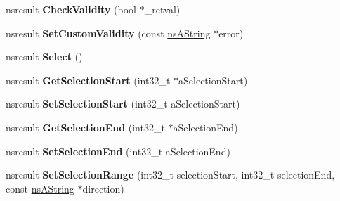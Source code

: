 \begin{DoxyCompactItemize}
\mbox{\label{interfacens_i_d_o_m_h_t_m_l_input_element_a459caa1fe50657547ba512b453958e2f}} 
nsresult {\bfseries Check\+Validity} (bool $\ast$\+\_\+retval)
\item 
\mbox{\label{interfacens_i_d_o_m_h_t_m_l_input_element_a54a45d978e473062d7197301ecad6f48}} 
nsresult {\bfseries Set\+Custom\+Validity} (const \hyperlink{structns_string_container}{ns\+A\+String} $\ast$error)
\item 
\mbox{\label{interfacens_i_d_o_m_h_t_m_l_input_element_ac6314e5414f88fbd97b91a10a953e798}} 
nsresult {\bfseries Select} ()
\item 
\mbox{\label{interfacens_i_d_o_m_h_t_m_l_input_element_a9e26a99d1ad66381ab9c08d5565771c8}} 
nsresult {\bfseries Get\+Selection\+Start} (int32\+\_\+t $\ast$a\+Selection\+Start)
\item 
\mbox{\label{interfacens_i_d_o_m_h_t_m_l_input_element_a3217a882144f3ec2d660e2bc3782343c}} 
nsresult {\bfseries Set\+Selection\+Start} (int32\+\_\+t a\+Selection\+Start)
\item 
\mbox{\label{interfacens_i_d_o_m_h_t_m_l_input_element_ab244f2337ffe96c9704ffb7c0984b0df}} 
nsresult {\bfseries Get\+Selection\+End} (int32\+\_\+t $\ast$a\+Selection\+End)
\item 
\mbox{\label{interfacens_i_d_o_m_h_t_m_l_input_element_a04a1818574f8b2c8cbe66786e5f41f6b}} 
nsresult {\bfseries Set\+Selection\+End} (int32\+\_\+t a\+Selection\+End)
\item 
\mbox{\label{interfacens_i_d_o_m_h_t_m_l_input_element_a55b4f4ea4b22c5230c4d35b82e2ed95b}} 
nsresult {\bfseries Set\+Selection\+Range} (int32\+\_\+t selection\+Start, int32\+\_\+t selection\+End, const \hyperlink{structns_string_container}{ns\+A\+String} $\ast$direction)
\item 
\mbox{\label{interfacens_i_d_o_m_h_t_m_l_input_element_ada128eb7c634d93941a8660664f567eb}} 

\end{DoxyCompactItemize}

